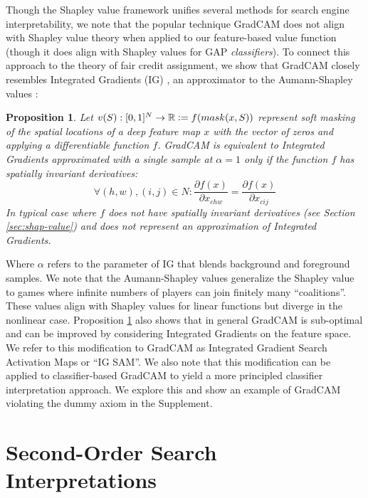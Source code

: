 \documentclass{article} %
\newtheorem{proposition}{Proposition}[section]
\newcommand{\defeq}{\vcentcolon=}
\begin{document}
Though the Shapley value framework unifies several methods for search engine interpretability, we note that the popular technique GradCAM does not align with Shapley value theory when applied to our feature-based value function (though it does align with Shapley values for GAP \textit{classifiers}). To connect this approach to the theory of fair credit assignment, we show that GradCAM closely resembles Integrated Gradients (IG) \citep{sundararajan2017axiomatic}, an approximator to the Aumann-Shapley values \citep{aumann2015values}:
\vspace{-.05in}
\begin{proposition}
\label{prop:ig}
 Let $v(S): [0,1]^N \to \mathbb{R} \defeq f(mask(x, S))$ represent soft masking of the spatial locations of a deep feature map $x$ with the vector of zeros and applying a differentiable function $f$. GradCAM is equivalent to Integrated Gradients approximated with a single sample at $\alpha=1$ only if the function $f$ has spatially invariant derivatives: 
 \vspace{-.05in}
 $$\forall (h,w),(i,j) \in N: \frac{\partial f(x)}{\partial x_{chw}} = \frac{\partial f(x)}{\partial x_{cij}}$$
 In typical case where $f$ does not have spatially invariant derivatives  (see Section \ref{sec:shap-value}) and does not represent an approximation of Integrated Gradients.
 \end{proposition}
 \vspace{-.05in}
Where $\alpha$ refers to the parameter of IG that blends background and foreground samples. We note that the Aumann-Shapley values generalize the Shapley value to games where infinite numbers of players can join finitely many ``coalitions''. These values align with Shapley values for linear functions but diverge in the nonlinear case. Proposition \ref{prop:ig} also shows that in general GradCAM is sub-optimal and can be improved by considering Integrated Gradients on the feature space. We refer to this modification to GradCAM as Integrated Gradient Search Activation Maps or ``IG SAM''. We also note that this modification can be applied to classifier-based GradCAM to yield a more principled classifier interpretation approach. We explore this and show an example of GradCAM violating the dummy axiom in the Supplement.


\vspace{-0.1in}
\section{Second-Order Search Interpretations}
\vspace{-.1in}
\end{document}
